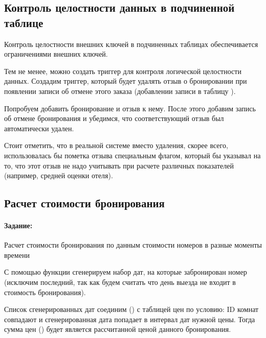 \subsection{Контроль целостности данных в подчиненной таблице}

Контроль целостности внешних ключей в подчиненных таблицах обеспечивается ограничениями  внешних ключей.



Тем не менее, можно создать триггер для контроля логической целостности данных. Создадим триггер, который будет удалять отзыв о бронировании при появлении записи об отмене этого заказа (добавлении записи в таблицу ).



Попробуем добавить бронирование и отзыв к нему. После этого добавим запись об отмене бронирования и убедимся, что соответствующий отзыв был автоматически удален.



Стоит отметить, что в реальной системе вместо удаления, скорее всего, использовалась бы пометка отзыва специальным флагом, который бы указывал на то, что этот отзыв не надо учитывать при расчете различных показателей (например, средней оценки отеля).

\subsection{Расчет стоимости бронирования}

\paragraph{Задание:} Расчет стоимости бронирования по данным стоимости номеров в разные моменты времени

С помощью функции  сгенерируем набор дат, на которые забронирован номер (исключим последний, так как будем считать что день выезда не входит в стоимость бронирования).

Список сгенерированных дат соединим () с таблицей цен по условию: ID комнат совпадают и сгенерированная дата попадает в интервал дат нужной цены. Тогда сумма цен () будет является рассчитанной ценой данного бронирования.

